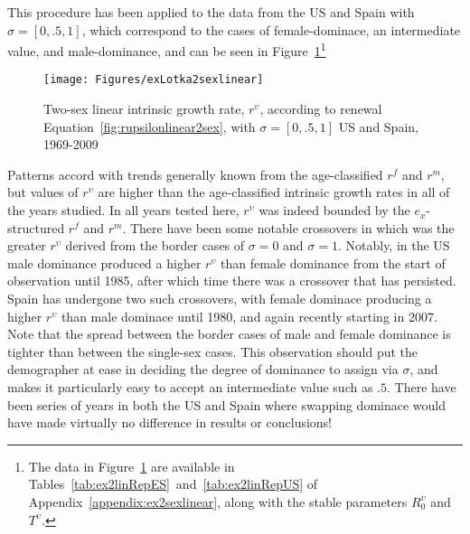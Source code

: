  \FloatBarrier
This procedure has been applied to the data from the US and Spain with $\sigma
= [0,.5,1]$, which correspond to the cases of female-dominace, an
intermediate value, and male-dominance, and can be seen in
Figure~\ref{fig:rupsilonlinear2sex}\footnote{The data in
    Figure~\ref{fig:rupsilonlinear2sex} are available in
    Tables~\ref{tab:ex2linRepES}~and~\ref{tab:ex2linRepUS} of
    Appendix~\ref{appendix:ex2sexlinear}, along with the stable parameters
    $R_0^\upsilon$ and $T^\upsilon$.}

\begin{figure}[!ht]
  \centering
    \caption{Two-sex linear intrinsic growth rate, $r^\upsilon$, according to
    renewal Equation~\eqref{fig:rupsilonlinear2sex}, with $\sigma = [0, .5, 1]$ US 
    and Spain, 1969-2009}
     \texttt{[image: Figures/exLotka2sexlinear]}
     \label{fig:rupsilonlinear2sex}
\end{figure}

Patterns accord with trends generally known from the age-classified $r^f$ and
$r^m$, but values of $r^\upsilon$ are higher than the
age-classified intrinsic growth rates in all of the years studied. In all years
tested here, $r^\upsilon$ was indeed bounded by the $e_x$-structured $r^f$ and $r^m$. There have been some notable crossovers in
which was the greater $r^\upsilon$ derived from the border cases of $\sigma = 0$
and  $\sigma = 1$. Notably, in the US male dominance produced a higher
$r^\upsilon$ than female dominance from the start of observation until
1985, after which time there was a crossover that has persisted. Spain has
undergone two such crossovers, with female dominace producing a higher
$r^\upsilon$ than male dominace until 1980, and again recently starting in 2007.
Note that the spread between the border cases of male and female dominance is
tighter than between the single-sex cases. This observation should put the
demographer at ease in deciding the degree of dominance to assign via $\sigma$,
and makes it particularly easy to accept an intermediate value such as $.5$.
There have been series of years in both the US and Spain where swapping dominace
would have made virtually no difference in results or conclusions!
